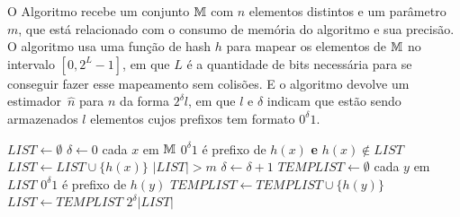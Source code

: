 O Algoritmo  recebe um conjunto $\mathbb{M}$ com $n$ elementos distintos e um parâmetro $m$, que está 
relacionado com o consumo de memória do algoritmo e sua precisão. O algoritmo usa uma função de hash $h$ para mapear os 
elementos de $\mathbb{M}$ no intervalo $[0, 2^L - 1]$, em que $L$ é a quantidade de bits necessária para se conseguir fazer 
esse mapeamento sem colisões. E o algoritmo devolve um estimador~$\hat{n}$ para $n$ da forma $2^{\delta} l$, em que $l$ 
e $\delta$ indicam que estão sendo armazenados $l$ elementos cujos prefixos tem formato $0^{\delta}1$.

\begin{codebox}
  \li $LIST \gets \emptyset$
  \li $\delta \gets 0$
  \li \For cada $x$ em $\mathbb{M}$ 
  \li    \Do 
         \If $0^{\delta}1$ é prefixo de $h(x)$ \textbf{e} $h(x) \not\in LIST$
  \li             \Then $LIST \gets LIST \cup \{ h(x) \}$
         \End
  \li    \While $|LIST| > m$
  \li    \Do
         $\delta \gets \delta + 1$
  \li    $TEMPLIST \gets \emptyset$
  \li    \For cada $y$ em $LIST$
  \li    \Do
            \If $0^{\delta}1$ é prefixo de $h(y)$
  \li       \Then $TEMPLIST \gets TEMPLIST \cup \{ h(y) \}$
            \End
         \End
  \li    $LIST \gets TEMPLIST$
         \End 
      \End
  \li
  \Return $2^{\delta} |LIST|$   
  \End
\end{codebox}